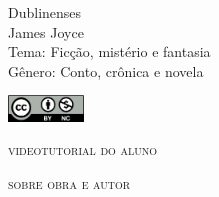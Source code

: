 \documentclass{article}
\begin{document}
										\begin{frame}\begin{raggedleft}
										\Huge 
Dublinenses						\\
										\huge 
James Joyce							\\
										\bigskip
										\normalsize
Tema: Ficção, mistério e fantasia		\\	
Gênero: Conto, crônica e novela			\\\vfill\hfill

\publishername

										\end{raggedleft}

\smallskip\includegraphics[width=2cm]{ccbync.png}\hfill
\end{frame}


\begin{frame}{\textsc{videotutorial do aluno}}
\vspace{-2cm}\begin{figure}
\end{figure}
\end{frame}



\begin{frame}
\hfill\Huge
\textsc{sobre obra e autor}
\end{frame}
\end{document}
